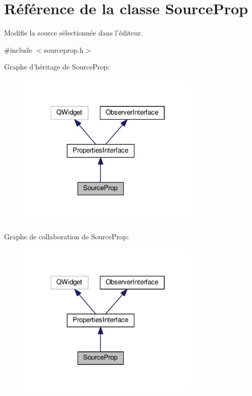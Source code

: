 \hypertarget{classSourceProp}{\section{Référence de la classe Source\+Prop}
\label{classSourceProp}
}


Modifie la source sélectionnée dans l’éditeur.  




{\ttfamily \#include $<$sourceprop.\+h$>$}



Graphe d'héritage de Source\+Prop\+:\nopagebreak
\begin{figure}[H]
\begin{center}
\leavevmode
\includegraphics[width=247pt]{d6/da2/classSourceProp__inherit__graph}
\end{center}
\end{figure}


Graphe de collaboration de Source\+Prop\+:\nopagebreak
\begin{figure}[H]
\begin{center}
\leavevmode
\includegraphics[width=247pt]{d0/d35/classSourceProp__coll__graph}
\end{center}
\end{figure}
